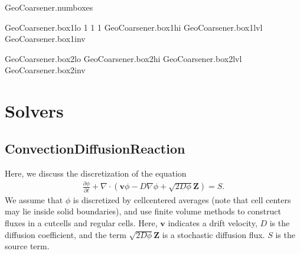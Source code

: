 \documentclass[letterpaper,10pt,english]{sphinxmanual}
\begin{document}
\begin{sphinxVerbatim}[commandchars=\\\{\},formatcom=\scriptsize]
GeoCoarsener.num\PYGZus{}boxes                

GeoCoarsener.box1\PYGZus{}lo      \PYGZhy{}1 \PYGZhy{}1 \PYGZhy{}1     
GeoCoarsener.box1\PYGZus{}hi                
GeoCoarsener.box1\PYGZus{}lvl                 
GeoCoarsener.box1\PYGZus{}inv             

GeoCoarsener.box2\PYGZus{}lo                
GeoCoarsener.box2\PYGZus{}hi                
GeoCoarsener.box2\PYGZus{}lvl                 
GeoCoarsener.box2\PYGZus{}inv             
\end{sphinxVerbatim}


\chapter{Solvers}
\label{\detokenize{index:solvers}}
\sphinxstepscope


\section{Convection\sphinxhyphen{}Diffusion\sphinxhyphen{}Reaction}
\label{\detokenize{Solvers/CDR:convection-diffusion-reaction}}\label{\detokenize{Solvers/CDR:chap-cdr}}\label{\detokenize{Solvers/CDR::doc}}
\sphinxAtStartPar
Here, we discuss the discretization of the equation
\begin{equation*}
\begin{split}\frac{\partial \phi}{\partial t} + \nabla\cdot\left(\mathbf{v} \phi - D\nabla \phi + \sqrt{2D\phi}\mathbf{Z}\right) = S.\end{split}
\end{equation*}
\sphinxAtStartPar
We assume that \(\phi\) is discretized by cell\sphinxhyphen{}centered averages (note that cell centers may lie inside solid boundaries), and use finite volume methods to construct fluxes in a cut\sphinxhyphen{}cells and regular cells.
Here, \(\mathbf{v}\) indicates a drift velocity, \(D\) is the diffusion coefficient, and the term \(\sqrt{2D\phi}\mathbf{Z}\) is a stochastic diffusion flux. \(S\) is the source term.
\end{document}
